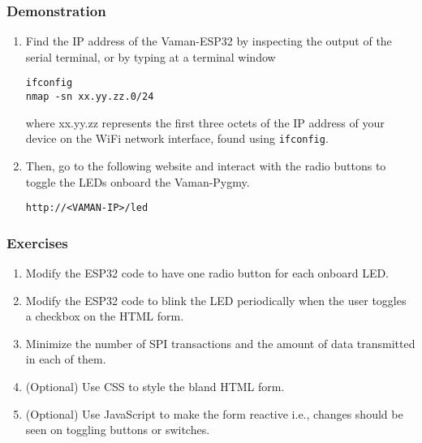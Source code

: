 \subsubsection{Demonstration}
\begin{enumerate}[resume]
    \item Find the IP address of the Vaman-ESP32 by inspecting the output of the
    serial terminal, or by typing at a terminal window
    \begin{lstlisting}
ifconfig
nmap -sn xx.yy.zz.0/24
    \end{lstlisting}
    where xx.yy.zz represents the first three octets of the IP address of your
    device on the WiFi network interface, found using \texttt{ifconfig}.
    \item Then, go to the following website and interact with the radio buttons
    to toggle the LEDs onboard the Vaman-Pygmy. 
    \begin{lstlisting}
http://<VAMAN-IP>/led
    \end{lstlisting}
\end{enumerate}

\subsubsection{Exercises}
\begin{enumerate}[resume]
    \item Modify the ESP32 code to have one radio button for each onboard LED.
    \item Modify the ESP32 code to blink the LED periodically when the user
    toggles a checkbox on the HTML form.
    \item Minimize the number of SPI transactions and the amount of data
    transmitted in each of them.
    \item (Optional) Use CSS to style the bland HTML form.
    \item (Optional) Use JavaScript to make the form reactive i.e., changes
    should be seen on toggling buttons or switches.
\end{enumerate}